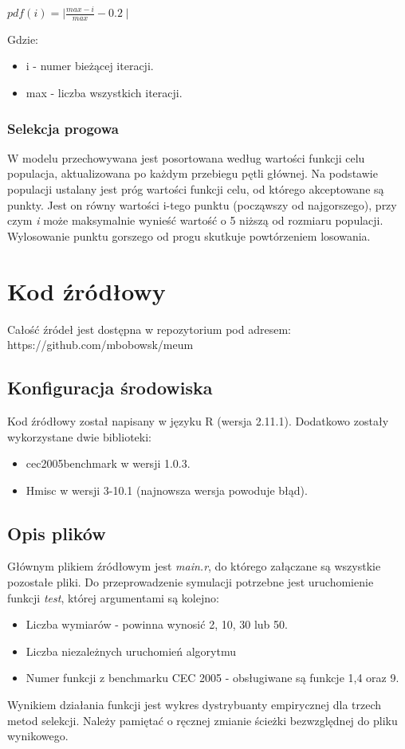 \documentclass[11pt]{article}
\begin{document}
\vspace{5pt}
\begin{math}
 pdf(i) = \mid \frac{max - i}{max} - 0.2 \mid
\end{math}
\vspace{5pt}

Gdzie:
\begin{itemize}
 \item i - numer bieżącej iteracji.
 \item max - liczba wszystkich iteracji.
\end{itemize}


\subsubsection{Selekcja progowa}
W modelu przechowywana jest posortowana według wartości funkcji celu populacja, aktualizowana po każdym przebiegu pętli głównej.
Na podstawie populacji ustalany jest próg wartości funkcji celu, od którego akceptowane są punkty.
Jest on równy wartości i-tego punktu (począwszy od najgorszego), przy czym \emph{i} może maksymalnie wynieść wartość o 5 niższą od rozmiaru populacji.
Wylosowanie punktu gorszego od progu skutkuje powtórzeniem losowania.

\section{Kod źródłowy}
Całość źródeł jest dostępna w repozytorium pod adresem: https://github.com/mbobowsk/meum
\subsection{Konfiguracja środowiska}
Kod źródłowy został napisany w języku R (wersja 2.11.1).
Dodatkowo zostały wykorzystane dwie biblioteki:
\begin{itemize}
 \item cec2005benchmark w wersji 1.0.3.
 \item Hmisc w wersji 3-10.1 (najnowsza wersja powoduje błąd).
\end{itemize}

\subsection{Opis plików}
Głównym plikiem źródłowym jest \emph{main.r}, do którego załączane są wszystkie pozostałe pliki.
Do przeprowadzenie symulacji potrzebne jest uruchomienie funkcji \emph{test}, której argumentami są kolejno:
\begin{itemize}
 \item Liczba wymiarów - powinna wynosić 2, 10, 30 lub 50.
 \item Liczba niezależnych uruchomień algorytmu
 \item Numer funkcji z benchmarku CEC 2005 - obsługiwane są funkcje 1,4 oraz 9.
\end{itemize}
Wynikiem działania funkcji jest wykres dystrybuanty empirycznej dla trzech metod selekcji.
Należy pamiętać o ręcznej zmianie ścieżki bezwzględnej do pliku wynikowego.
\end{document}
